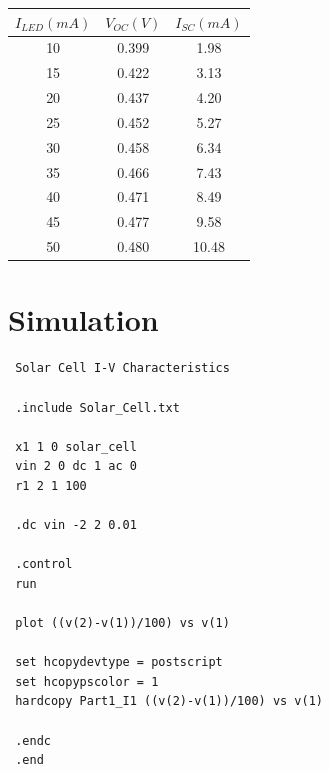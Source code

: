 \documentclass[12pt]{article}
\begin{document}
\begin{center}
 \begin{tabular}{||c c c||} 
 \hline
 \( I_{LED} (mA) \) & \( V_{OC} (V) \) & \( I_{SC} (mA) \) \\ [0.25ex] 
 \hline\hline
 \hline 
10 & 0.399 & 1.98 \\ \hline
15 & 0.422 & 3.13 \\ \hline
20 & 0.437 & 4.20 \\ \hline
25 & 0.452 & 5.27 \\ \hline
30 & 0.458 & 6.34 \\ \hline
35 & 0.466 & 7.43 \\ \hline
40 & 0.471 & 8.49 \\ \hline
45 & 0.477 & 9.58 \\ \hline
50 & 0.480 & 10.48 \\ \hline
\end{tabular}
\end{center}

\section{Simulation}
\begin{verbatim}
 Solar Cell I-V Characteristics

 .include Solar_Cell.txt

 x1 1 0 solar_cell
 vin 2 0 dc 1 ac 0
 r1 2 1 100

 .dc vin -2 2 0.01

 .control
 run

 plot ((v(2)-v(1))/100) vs v(1)

 set hcopydevtype = postscript
 set hcopypscolor = 1
 hardcopy Part1_I1 ((v(2)-v(1))/100) vs v(1)

 .endc
 .end

\end{verbatim}
\end{document}

